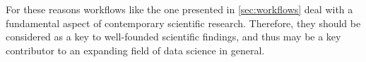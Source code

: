 For these reasons workflows like the one presented in \cref{sec:workflows} deal with a fundamental aspect of contemporary scientific research.  Therefore, they should be considered as a key to well-founded scientific findings, and thus may be a key contributor to an expanding field of data science in general.
